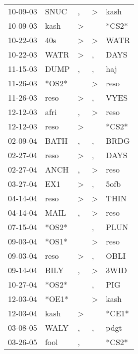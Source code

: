 \begin{supertabular}{lllll}
 10-09-03 &   SNUC &                , &     \textgreater &   kash \\
 10-09-03 &   kash &     \textgreater &                  &  *CS2* \\
 10-22-03 &    40s &     \textgreater &     \textgreater &   WATR \\
 10-22-03 &   WATR &     \textgreater &                , &   DAYS \\
 11-15-03 &   DUMP &                , &                , &    haj \\
 11-26-03 &  *OS2* &                  &     \textgreater &   reso \\
 11-26-03 &   reso &     \textgreater &                , &   VYES \\
 12-12-03 &   afri &                , &     \textgreater &   reso \\
 12-12-03 &   reso &     \textgreater &                  &  *CS2* \\
 02-09-04 &   BATH &                , &                , &   BRDG \\
 02-27-04 &   reso &     \textgreater &                , &   DAYS \\
 02-27-04 &   ANCH &                , &     \textgreater &   reso \\
 03-27-04 &    EX1 &     \textgreater &                , &   5ofb \\
 04-14-04 &   reso &     \textgreater &     \textgreater &   THIN \\
 04-14-04 &   MAIL &                , &     \textgreater &   reso \\
 07-15-04 &  *OS2* &                  &                , &   PLUN \\
 09-03-04 &  *OS1* &                  &     \textgreater &   reso \\
 09-03-04 &   reso &     \textgreater &                , &   OBLI \\
 09-14-04 &   BILY &                , &     \textgreater &   3WID \\
 10-27-04 &  *OS2* &                  &                , &    PIG \\
 12-03-04 &  *OE1* &                  &     \textgreater &   kash \\
 12-03-04 &   kash &     \textgreater &                  &  *CE1* \\
 03-08-05 &   WALY &                , &                , &   pdgt \\
 03-26-05 &   fool &                , &                  &  *CS2* \\

\end{supertabular}
